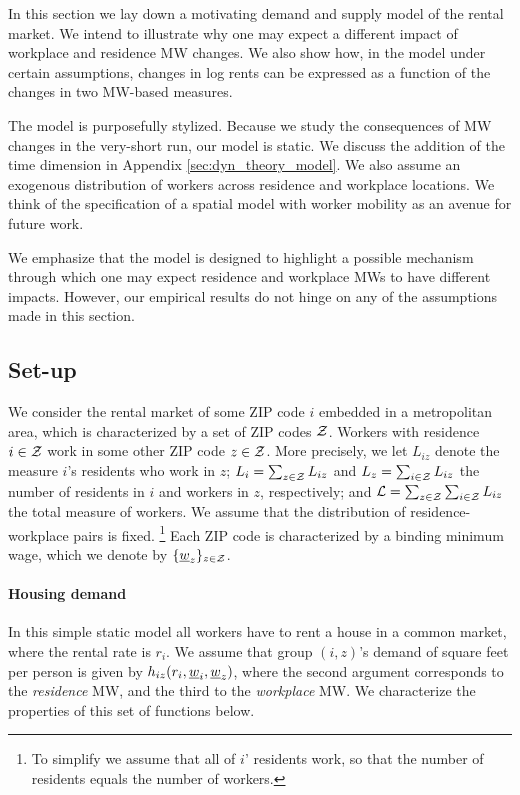 
In this section we lay down a motivating demand and supply model of the rental market. 
We intend to illustrate why one may expect a different impact of workplace and residence
MW changes.
We also show how, in the model under certain assumptions, changes in log rents can 
be expressed as a function of the changes in two MW-based measures.

The model is purposefully stylized.
Because we study the consequences of MW changes in the very-short run, our model is 
static. 
We discuss the addition of the time dimension in Appendix \ref{sec:dyn_theory_model}.
We also assume an exogenous distribution of workers across residence and workplace 
locations.
We think of the specification of a spatial model with worker mobility as an avenue 
for future work.

We emphasize that the model is designed to highlight a possible mechanism through 
which one may expect residence and workplace MWs to have different impacts. 
However, our empirical results do not hinge on any of the assumptions made in this 
section.

\subsection{Set-up}

We consider the rental market of some ZIP code $i$ embedded in a metropolitan area, 
which is characterized by a set of ZIP codes $\mathcal{Z}$.
Workers with residence $i\in\mathcal{Z}$ work in some other ZIP code $z\in\mathcal{Z}$. 
More precisely, we let $L_{iz}$ denote the measure $i$'s residents who work in $z$;
$L_i = \sum_{z \in \mathcal{Z}} L_{iz}$ and $L_z = \sum_{i \in \mathcal{Z}} L_{iz}$ 
the number of residents in $i$ and workers in $z$, respectively;
and $\mathcal{L}=\sum_{z \in \mathcal{Z}}\sum_{i \in \mathcal{Z}}L_{iz}$ the total measure of workers. 
We assume that the distribution of residence-workplace pairs is fixed.%
\footnote{To simplify we assume that all of $i$' residents work, so that the number
of residents equals the number of workers.}
Each ZIP code is characterized by a binding minimum wage, which we denote by 
$\{\underline{w}_z\}_{z\in\mathcal{Z}}$.

\paragraph{Housing demand}

In this simple static model all workers have to rent a house in a common market, 
where the rental rate is $r_i$. 
We assume that group $(i,z)$'s demand of square feet per person is given by $h_{iz} (r_i, 
\underline{w}_i, \underline{w}_z)$, where the second argument corresponds to the \textit{residence} MW, and 
the third to the \textit{workplace} MW. 
We characterize the properties of this set of functions below.

